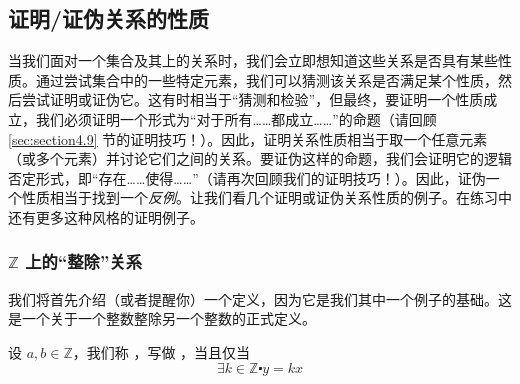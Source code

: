 
\subsection{证明/证伪关系的性质}

当我们面对一个集合及其上的关系时，我们会立即想知道这些关系是否具有某些性质。通过尝试集合中的一些特定元素，我们可以猜测该关系是否满足某个性质，然后尝试证明或证伪它。这有时相当于``猜测和检验''，但最终，要证明一个性质成立，我们必须证明一个形式为``对于所有……都成立……''的命题（请回顾 \ref{sec:section4.9} 节的证明技巧！）。因此，证明关系性质相当于取一个任意元素（或多个元素）并讨论它们之间的关系。要证伪这样的命题，我们会证明它的逻辑否定形式，即``存在……使得……''（请再次回顾我们的证明技巧！）。因此，证伪一个性质相当于找到一个\emph{反例}。让我们看几个证明或证伪关系性质的例子。在练习中还有更多这种风格的证明例子。

\subsubsection*{$\mathbb{Z}$ 上的``整除''关系}

我们将首先介绍（或者提醒你）一个定义，因为它是我们其中一个例子的基础。这是一个关于一个整数整除另一个整数的正式定义。

\begin{definition}\label{def:definition6.2.15}
    设 $a,b \in \mathbb{Z}$，我们称 ，写做 ，当且仅当
    \[\exists k \in \mathbb{Z} \centerdot y = kx\]
\end{definition}

